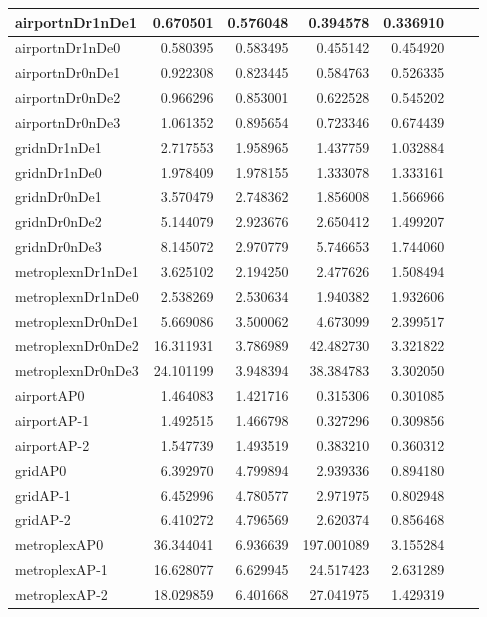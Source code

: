 \begin{longtable}{|l|r|r|r|r|r|r|}
\endlastfoot
airportnDr1nDe1 & 0.670501 & 0.576048 & 0.394578 & 0.336910 \\ \hline
airportnDr1nDe0 & 0.580395 & 0.583495 & 0.455142 & 0.454920 \\ \hline
airportnDr0nDe1 & 0.922308 & 0.823445 & 0.584763 & 0.526335 \\ \hline
airportnDr0nDe2 & 0.966296 & 0.853001 & 0.622528 & 0.545202 \\ \hline
airportnDr0nDe3 & 1.061352 & 0.895654 & 0.723346 & 0.674439 \\ \hline
gridnDr1nDe1 & 2.717553 & 1.958965 & 1.437759 & 1.032884 \\ \hline
gridnDr1nDe0 & 1.978409 & 1.978155 & 1.333078 & 1.333161 \\ \hline
gridnDr0nDe1 & 3.570479 & 2.748362 & 1.856008 & 1.566966 \\ \hline
gridnDr0nDe2 & 5.144079 & 2.923676 & 2.650412 & 1.499207 \\ \hline
gridnDr0nDe3 & 8.145072 & 2.970779 & 5.746653 & 1.744060 \\ \hline
metroplexnDr1nDe1 & 3.625102 & 2.194250 & 2.477626 & 1.508494 \\ \hline
metroplexnDr1nDe0 & 2.538269 & 2.530634 & 1.940382 & 1.932606 \\ \hline
metroplexnDr0nDe1 & 5.669086 & 3.500062 & 4.673099 & 2.399517 \\ \hline
metroplexnDr0nDe2 & 16.311931 & 3.786989 & 42.482730 & 3.321822 \\ \hline
metroplexnDr0nDe3 & 24.101199 & 3.948394 & 38.384783 & 3.302050 \\ \hline
airportAP0 & 1.464083 & 1.421716 & 0.315306 & 0.301085 \\ \hline
airportAP-1 & 1.492515 & 1.466798 & 0.327296 & 0.309856 \\ \hline
airportAP-2 & 1.547739 & 1.493519 & 0.383210 & 0.360312 \\ \hline
gridAP0 & 6.392970 & 4.799894 & 2.939336 & 0.894180 \\ \hline
gridAP-1 & 6.452996 & 4.780577 & 2.971975 & 0.802948 \\ \hline
gridAP-2 & 6.410272 & 4.796569 & 2.620374 & 0.856468 \\ \hline
metroplexAP0 & 36.344041 & 6.936639 & 197.001089 & 3.155284 \\ \hline
metroplexAP-1 & 16.628077 & 6.629945 & 24.517423 & 2.631289 \\ \hline
metroplexAP-2 & 18.029859 & 6.401668 & 27.041975 & 1.429319 \\ \hline

\end{longtable}
